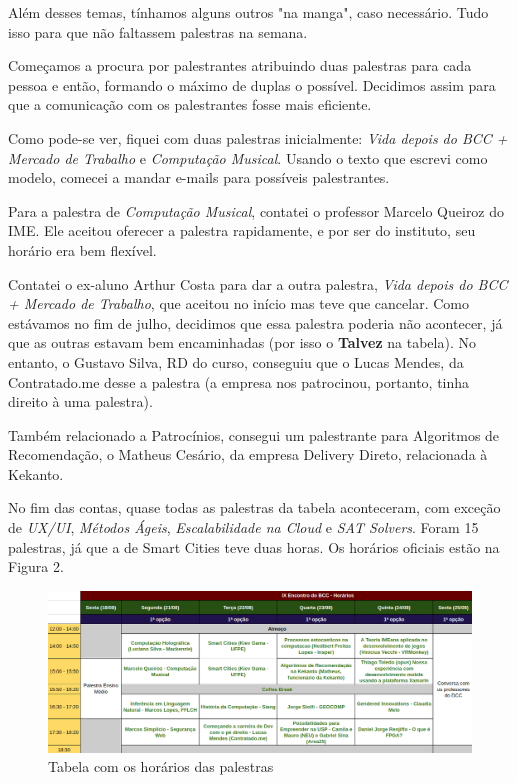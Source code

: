 \documentclass[12pt,letterpaper]{article}
\begin{document}
	Além desses temas, tínhamos alguns outros "na manga", caso necessário. Tudo isso para que não faltassem palestras na semana.
	
	Começamos a procura por palestrantes atribuindo duas palestras para cada pessoa e então, formando o máximo de duplas o possível. Decidimos assim para que a comunicação com os palestrantes fosse mais eficiente. 
	
	Como pode-se ver, fiquei com duas palestras inicialmente: \textit{Vida depois do BCC + Mercado de Trabalho} e \textit{Computação Musical}. Usando o texto que escrevi como modelo\cite{modelo_palestras}, comecei a mandar e-mails para possíveis palestrantes. 
	
	Para a palestra de \textit{Computação Musical}, contatei o professor Marcelo Queiroz do IME. Ele aceitou oferecer a palestra rapidamente, e por ser do instituto, seu horário era bem flexível.
	
	Contatei o ex-aluno Arthur Costa para dar a outra palestra, \textit{Vida depois do BCC + Mercado de Trabalho}, que aceitou no início mas teve que cancelar. Como estávamos no fim de julho, decidimos que essa palestra poderia não acontecer, já que as outras estavam bem encaminhadas (por isso o \textbf{{\color{orange} Talvez}} na tabela). No entanto, o Gustavo Silva, RD do curso, conseguiu que o Lucas Mendes, da Contratado.me desse a palestra (a empresa nos patrocinou, portanto, tinha direito à uma palestra).
	
	Também relacionado a Patrocínios, consegui um palestrante para Algoritmos de Recomendação, o Matheus Cesário, da empresa Delivery Direto, relacionada à Kekanto.
	
	No fim das contas, quase todas as palestras da tabela aconteceram, com exceção de \textit{UX/UI}, \textit{Métodos Ágeis}, \textit{Escalabilidade na Cloud} e \textit{SAT Solvers}. Foram 15 palestras, já que a de Smart Cities teve duas horas. Os horários oficiais estão na Figura 2.
	
	\begin{figure}
		\begin{center}
			\includegraphics[scale=0.43]{horarios.png} 
			\caption{Tabela com os horários das palestras}
		\end{center}
	\end{figure}
\end{document}
